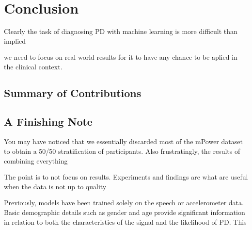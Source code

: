 \documentclass[12pt, twoside]{book}
\begin{document}
\chapter{Conclusion}
Clearly the task of diagnosing PD with machine learning is more difficult than implied

we need to focus on real world results for it to have any chance to be aplied in the clinical context.



\section{Summary of Contributions}


\section{A Finishing Note}
You may have noticed that we essentially discarded most of the mPower dataset to obtain a 50/50 stratification of participants. Also frustratingly, the results of combining everything 

The point is to not focus on results. Experiments and findings are what are useful when the data is not up to quality 

Previously, models have been trained solely on the speech or accelerometer data. Basic demographic details such as gender and age provide significant information in relation to both the characteristics of the signal and the likelihood of PD. This 


\backmatter


\end{document}
